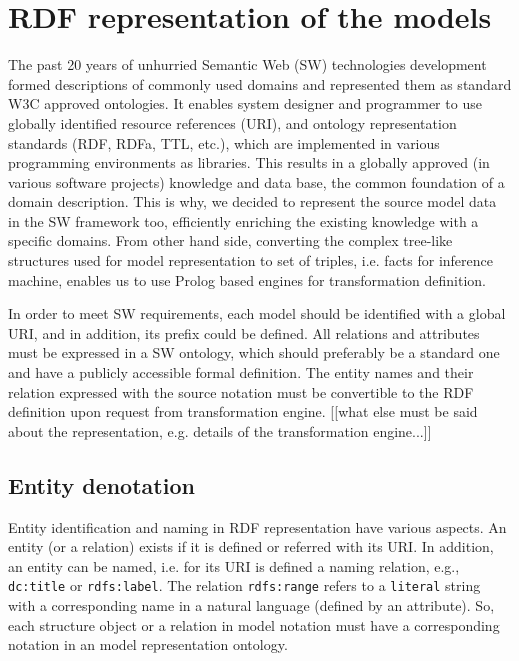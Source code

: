 \documentclass[conference]{IEEEtran}
\begin{document}

\section{RDF representation of the models}
\label{sec:rdf-repr}

The past 20 years of unhurried Semantic Web (SW) technologies development formed descriptions of commonly used domains and represented them as standard W3C approved ontologies.  It enables system designer and programmer to use globally identified resource references (URI), and ontology representation standards (RDF, RDFa, TTL, etc.), which are implemented in various programming environments as libraries.  This results in a globally approved (in various software projects) knowledge and data base, the common foundation of a domain description.  This is why, we decided to represent the source model data in the SW framework too, efficiently enriching the existing knowledge with a specific domains.  From other hand side, converting the complex tree-like structures used for model representation to set of triples, i.e. facts for inference machine, enables us to use Prolog based engines for transformation definition.

In order to meet SW requirements, each model should be identified with a global URI, and in addition, its prefix could be defined.  All relations and attributes must be expressed in a SW ontology, which should preferably be a standard one and have a publicly accessible formal definition.  The entity names and their relation expressed with the source notation must be convertible to the RDF definition upon request from transformation engine.  [[what else must be said about the representation, e.g. details of the transformation engine...]]

\subsection{Entity denotation}
\label{sec:ent-def}

Entity identification and naming in RDF representation have various aspects.  An entity (or a relation) exists if it is defined or referred with its URI.  In addition, an entity can be named,  i.e. for its URI is defined a naming relation, e.g., \texttt{dc:title} or \texttt{rdfs:label}.  The relation \texttt{rdfs:range} refers to a \texttt{literal} string with a corresponding name in a natural language (defined by an attribute).  So, each structure object or a relation in model notation must have a corresponding notation in an model representation ontology.
\end{document}
